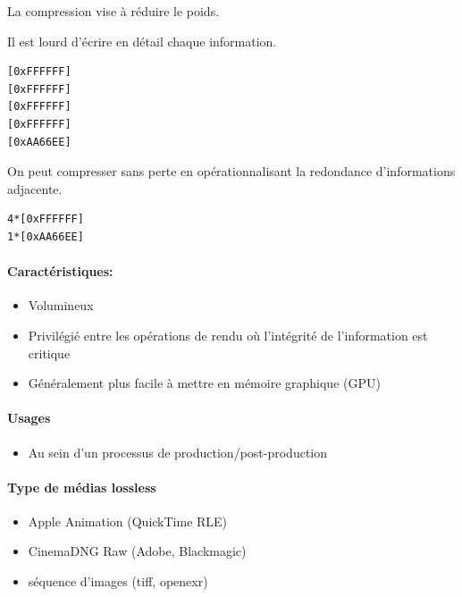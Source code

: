 \documentclass[
  french,
]{book}
\providecommand{\tightlist}{%
  \setlength{\itemsep}{0pt}\setlength{\parskip}{0pt}}
\begin{document}
La compression vise à réduire le poids.

Il est lourd d'écrire en détail chaque information.

\begin{verbatim}
[0xFFFFFF]
[0xFFFFFF]
[0xFFFFFF]
[0xFFFFFF]
[0xAA66EE]
\end{verbatim}

On peut compresser sans perte en opérationnalisant la redondance d'informations adjacente.

\begin{verbatim}
4*[0xFFFFFF]
1*[0xAA66EE]
\end{verbatim}

\hypertarget{caractuxe9ristiques}{%
\paragraph{Caractéristiques:}\label{caractuxe9ristiques}}

\begin{itemize}
\tightlist
\item
  Volumineux
\item
  Privilégié entre les opérations de rendu où l'intégrité de l'information est critique
\item
  Généralement plus facile à mettre en mémoire graphique (GPU)
\end{itemize}

\hypertarget{usages-1}{%
\paragraph{Usages}\label{usages-1}}

\begin{itemize}
\tightlist
\item
  Au sein d'un processus de production/post-production
\end{itemize}

\hypertarget{type-de-muxe9dias-lossless}{%
\paragraph{Type de médias lossless}\label{type-de-muxe9dias-lossless}}

\begin{itemize}
\tightlist
\item
  Apple Animation (QuickTime RLE)
\item
  CinemaDNG Raw (Adobe, Blackmagic)
\item
  séquence d'images (tiff, openexr)
\end{itemize}
\end{document}
